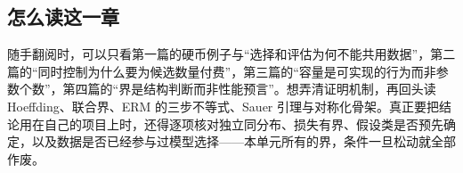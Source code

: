 \subsection{怎么读这一章}

随手翻阅时，可以只看第一篇的硬币例子与``选择和评估为何不能共用数据''，第二篇的``同时控制为什么要为候选数量付费''，第三篇的``容量是可实现的行为而非参数个数''，第四篇的``界是结构判断而非性能预言''。想弄清证明机制，再回头读 Hoeffding、联合界、ERM 的三步不等式、Sauer 引理与对称化骨架。真正要把结论用在自己的项目上时，还得逐项核对独立同分布、损失有界、假设类是否预先确定，以及数据是否已经参与过模型选择——本单元所有的界，条件一旦松动就全部作废。

